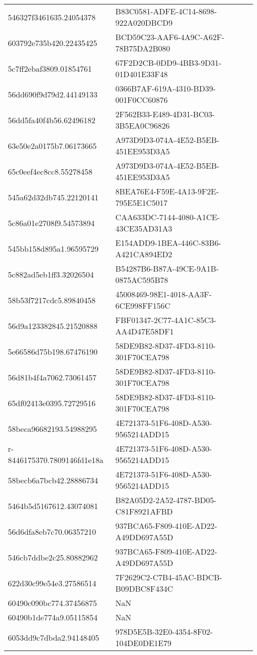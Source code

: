 \begin{tabular}{ll}
546327f3461635.24054378 & B83C0581-ADFE-4C14-8698-922A020DBCD9 \\
603792e735b420.22435425 & BCD59C23-AAF6-4A9C-A62F-78B75DA2B080 \\
5c7ff2ebaf3809.01854761 & 67F2D2CB-0DD9-4BB3-9D31-01D401E33F48 \\
56dd690f9d79d2.44149133 & 0366B7AF-619A-4310-BD39-001F0CC60876 \\
56dd5fa40f4b56.62496182 & 2F562B33-E489-4D31-BC03-3B5EA0C96826 \\
63e50e2a0175b7.06173665 & A973D9D3-074A-4E52-B5EB-451EE953D3A5 \\
65c0eef4ec8cc8.55278458 & A973D9D3-074A-4E52-B5EB-451EE953D3A5 \\
545a62d32db745.22120141 & 8BEA76E4-F59E-4A13-9F2E-795E5E1C5017 \\
5c86a01e2708f9.54573894 & CAA633DC-7144-4080-A1CE-43CE35AD31A3 \\
545bb158d895a1.96595729 & E154ADD9-1BEA-446C-83B6-A421CA894ED2 \\
5c882ad5eb1ff3.32026504 & B54287B6-B87A-49CE-9A1B-0875AC595B78 \\
58b53f7217cdc5.89840458 & 45008469-98E1-4018-AA3F-6CE998FF156C \\
56d9a123382845.21520888 & FBF01347-2C77-4A1C-85C3-AA4D47E58DF1 \\
5e66586d75b198.67476190 & 58DE9B82-8D37-4FD3-8110-301F70CEA798 \\
56d81b4f4a7062.73061457 & 58DE9B82-8D37-4FD3-8110-301F70CEA798 \\
65df02413e0395.72729516 & 58DE9B82-8D37-4FD3-8110-301F70CEA798 \\
58beca96682193.54988295 & 4E721373-51F6-408D-A530-9565214ADD15 \\
r-8446175370.7809146fd1e18a & 4E721373-51F6-408D-A530-9565214ADD15 \\
58becb6a7bcb42.28886734 & 4E721373-51F6-408D-A530-9565214ADD15 \\
5464b5d5167612.43074081 & B82A05D2-2A52-4787-BD05-C81F8921AFBD \\
56d6dfa8eb7c70.06357210 & 937BCA65-F809-410E-AD22-A49DD697A55D \\
546cb7ddbe2c25.80882962 & 937BCA65-F809-410E-AD22-A49DD697A55D \\
622d30c99e54e3.27586514 & 7F2629C2-C7B4-45AC-BDCB-B09DBC8F434C \\
60490c090bc774.37456875 & NaN \\
60490b1de774a9.05115854 & NaN \\
6053dd9c7dbda2.94148405 & 978D5E5B-32E0-4354-8F02-104DE0DE1E79 \\

\end{tabular}
